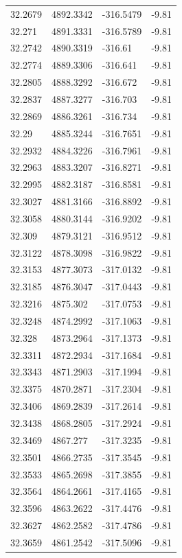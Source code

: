 \begin{table}[H]
\begin{tabular}{llll}
32.2679 & 4892.3342 & -316.5479 & -9.81 \\
32.271 & 4891.3331 & -316.5789 & -9.81 \\
32.2742 & 4890.3319 & -316.61 & -9.81 \\
32.2774 & 4889.3306 & -316.641 & -9.81 \\
32.2805 & 4888.3292 & -316.672 & -9.81 \\
32.2837 & 4887.3277 & -316.703 & -9.81 \\
32.2869 & 4886.3261 & -316.734 & -9.81 \\
32.29 & 4885.3244 & -316.7651 & -9.81 \\
32.2932 & 4884.3226 & -316.7961 & -9.81 \\
32.2963 & 4883.3207 & -316.8271 & -9.81 \\
32.2995 & 4882.3187 & -316.8581 & -9.81 \\
32.3027 & 4881.3166 & -316.8892 & -9.81 \\
32.3058 & 4880.3144 & -316.9202 & -9.81 \\
32.309 & 4879.3121 & -316.9512 & -9.81 \\
32.3122 & 4878.3098 & -316.9822 & -9.81 \\
32.3153 & 4877.3073 & -317.0132 & -9.81 \\
32.3185 & 4876.3047 & -317.0443 & -9.81 \\
32.3216 & 4875.302 & -317.0753 & -9.81 \\
32.3248 & 4874.2992 & -317.1063 & -9.81 \\
32.328 & 4873.2964 & -317.1373 & -9.81 \\
32.3311 & 4872.2934 & -317.1684 & -9.81 \\
32.3343 & 4871.2903 & -317.1994 & -9.81 \\
32.3375 & 4870.2871 & -317.2304 & -9.81 \\
32.3406 & 4869.2839 & -317.2614 & -9.81 \\
32.3438 & 4868.2805 & -317.2924 & -9.81 \\
32.3469 & 4867.277 & -317.3235 & -9.81 \\
32.3501 & 4866.2735 & -317.3545 & -9.81 \\
32.3533 & 4865.2698 & -317.3855 & -9.81 \\
32.3564 & 4864.2661 & -317.4165 & -9.81 \\
32.3596 & 4863.2622 & -317.4476 & -9.81 \\
32.3627 & 4862.2582 & -317.4786 & -9.81 \\
32.3659 & 4861.2542 & -317.5096 & -9.81 \\

\end{tabular}
\end{table}
